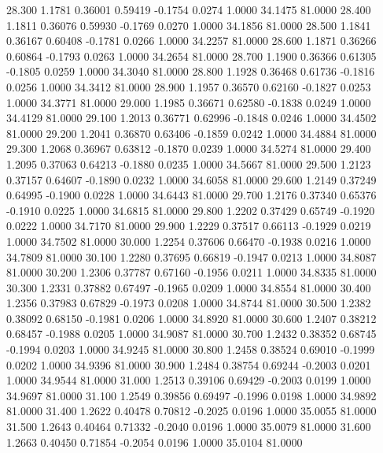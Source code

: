   28.300   1.1781   0.36001   0.59419  -0.1754   0.0274   1.0000  34.1475  81.0000
  28.400   1.1811   0.36076   0.59930  -0.1769   0.0270   1.0000  34.1856  81.0000
  28.500   1.1841   0.36167   0.60408  -0.1781   0.0266   1.0000  34.2257  81.0000
  28.600   1.1871   0.36266   0.60864  -0.1793   0.0263   1.0000  34.2654  81.0000
  28.700   1.1900   0.36366   0.61305  -0.1805   0.0259   1.0000  34.3040  81.0000
  28.800   1.1928   0.36468   0.61736  -0.1816   0.0256   1.0000  34.3412  81.0000
  28.900   1.1957   0.36570   0.62160  -0.1827   0.0253   1.0000  34.3771  81.0000
  29.000   1.1985   0.36671   0.62580  -0.1838   0.0249   1.0000  34.4129  81.0000
  29.100   1.2013   0.36771   0.62996  -0.1848   0.0246   1.0000  34.4502  81.0000
  29.200   1.2041   0.36870   0.63406  -0.1859   0.0242   1.0000  34.4884  81.0000
  29.300   1.2068   0.36967   0.63812  -0.1870   0.0239   1.0000  34.5274  81.0000
  29.400   1.2095   0.37063   0.64213  -0.1880   0.0235   1.0000  34.5667  81.0000
  29.500   1.2123   0.37157   0.64607  -0.1890   0.0232   1.0000  34.6058  81.0000
  29.600   1.2149   0.37249   0.64995  -0.1900   0.0228   1.0000  34.6443  81.0000
  29.700   1.2176   0.37340   0.65376  -0.1910   0.0225   1.0000  34.6815  81.0000
  29.800   1.2202   0.37429   0.65749  -0.1920   0.0222   1.0000  34.7170  81.0000
  29.900   1.2229   0.37517   0.66113  -0.1929   0.0219   1.0000  34.7502  81.0000
  30.000   1.2254   0.37606   0.66470  -0.1938   0.0216   1.0000  34.7809  81.0000
  30.100   1.2280   0.37695   0.66819  -0.1947   0.0213   1.0000  34.8087  81.0000
  30.200   1.2306   0.37787   0.67160  -0.1956   0.0211   1.0000  34.8335  81.0000
  30.300   1.2331   0.37882   0.67497  -0.1965   0.0209   1.0000  34.8554  81.0000
  30.400   1.2356   0.37983   0.67829  -0.1973   0.0208   1.0000  34.8744  81.0000
  30.500   1.2382   0.38092   0.68150  -0.1981   0.0206   1.0000  34.8920  81.0000
  30.600   1.2407   0.38212   0.68457  -0.1988   0.0205   1.0000  34.9087  81.0000
  30.700   1.2432   0.38352   0.68745  -0.1994   0.0203   1.0000  34.9245  81.0000
  30.800   1.2458   0.38524   0.69010  -0.1999   0.0202   1.0000  34.9396  81.0000
  30.900   1.2484   0.38754   0.69244  -0.2003   0.0201   1.0000  34.9544  81.0000
  31.000   1.2513   0.39106   0.69429  -0.2003   0.0199   1.0000  34.9697  81.0000
  31.100   1.2549   0.39856   0.69497  -0.1996   0.0198   1.0000  34.9892  81.0000
  31.400   1.2622   0.40478   0.70812  -0.2025   0.0196   1.0000  35.0055  81.0000
  31.500   1.2643   0.40464   0.71332  -0.2040   0.0196   1.0000  35.0079  81.0000
  31.600   1.2663   0.40450   0.71854  -0.2054   0.0196   1.0000  35.0104  81.0000
